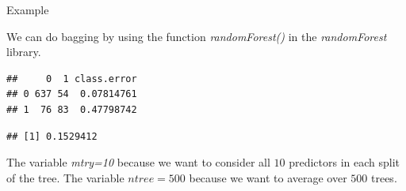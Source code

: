 \documentclass[10pt,ignorenonframetext,]{beamer}
\newenvironment{Shaded}{\begin{snugshade}}{\end{snugshade}}
\newcommand{\KeywordTok}[1]{\textcolor[rgb]{0.13,0.29,0.53}{\textbf{#1}}}
\newcommand{\DataTypeTok}[1]{\textcolor[rgb]{0.13,0.29,0.53}{#1}}
\newcommand{\DecValTok}[1]{\textcolor[rgb]{0.00,0.00,0.81}{#1}}
\newcommand{\StringTok}[1]{\textcolor[rgb]{0.31,0.60,0.02}{#1}}
\newcommand{\OtherTok}[1]{\textcolor[rgb]{0.56,0.35,0.01}{#1}}
\newcommand{\OperatorTok}[1]{\textcolor[rgb]{0.81,0.36,0.00}{\textbf{#1}}}
\newcommand{\NormalTok}[1]{#1}
\begin{document}
\begin{frame}[fragile]

\begin{block}{Example}

We can do bagging by using the function \emph{randomForest()} in the
\emph{randomForest} library.

\footnotesize

\begin{Shaded}
\end{Shaded}

\begin{verbatim}
##     0  1 class.error
## 0 637 54  0.07814761
## 1  76 83  0.47798742
\end{verbatim}

\begin{Shaded}
\end{Shaded}

\begin{verbatim}
## [1] 0.1529412
\end{verbatim}

\normalsize

The variable \emph{mtry=10} because we want to consider all \(10\)
predictors in each split of the tree. The variable \(ntree=500\) because
we want to average over \(500\) trees.

\end{block}

\end{frame}
\end{document}
